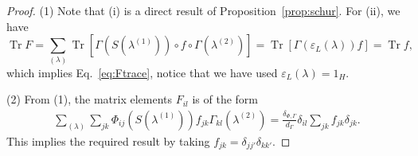 \documentclass[a4paper,11pt]{article}
\theoremstyle{theorem}
\theoremstyle{remark}
\newcommand{\cone}{(1)}
\newcommand{\ctwo}{(2)}
\newcommand\Tr{\operatorname{Tr}}
\begin{document}
\begin{proof}
   (1) Note that (i) is a direct result of Proposition~\ref{prop:schur}.  For (ii), we have
   \begin{equation}
        \Tr F= \sum_{(\lambda)} \Tr [\Gamma(S(\lambda^{(1)})) \circ f \circ \Gamma(\lambda^{\ctwo})]=\Tr [\Gamma(\varepsilon_L(\lambda)) f]=\Tr f,
    \end{equation}
which implies Eq.~\eqref{eq:Ftrace}, notice that we have used $\varepsilon_L(\lambda)=1_H$.

(2) From (1), the matrix elements $F_{il}$ is of the form
\begin{equation}
    \begin{aligned}
         \sum_{(\lambda)} \sum_{jk} \Phi_{ij}(S(\lambda^{\cone}))f_{jk} \Gamma_{kl}(\lambda^{\ctwo})=  \frac{\delta_{\Phi,\Gamma}}{d_{\Gamma}} \delta_{il} \sum_{jk} f_{jk}\delta_{jk}.
    \end{aligned}
\end{equation}
This implies the required result by taking $f_{jk}=\delta_{jj'}\delta_{kk'}$.
\end{proof}
\end{document}
